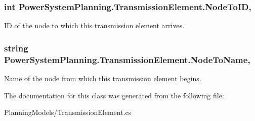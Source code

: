 \subsubsection[{\texorpdfstring{Node\+To\+ID}{NodeToID}}]{\setlength{\rightskip}{0pt plus 5cm}int Power\+System\+Planning.\+Transmission\+Element.\+Node\+To\+ID\hspace{0.3cm}{\ttfamily [get]}, {\ttfamily [set]}}\hypertarget{class_power_system_planning_1_1_transmission_element_a670796e35f8f4af35326cfc1dd1b104f}{}\label{class_power_system_planning_1_1_transmission_element_a670796e35f8f4af35326cfc1dd1b104f}


ID of the node to which this transmission element arrives. 

\subsubsection[{\texorpdfstring{Node\+To\+Name}{NodeToName}}]{\setlength{\rightskip}{0pt plus 5cm}string Power\+System\+Planning.\+Transmission\+Element.\+Node\+To\+Name\hspace{0.3cm}{\ttfamily [get]}, {\ttfamily [set]}}\hypertarget{class_power_system_planning_1_1_transmission_element_ad6028ae3c8e7ac1527cfde854c81dedd}{}\label{class_power_system_planning_1_1_transmission_element_ad6028ae3c8e7ac1527cfde854c81dedd}


Name of the node from which this transmission element begins. 



The documentation for this class was generated from the following file\+:\begin{DoxyCompactItemize}
\item 
Planning\+Models/Transmission\+Element.\+cs\end{DoxyCompactItemize}

